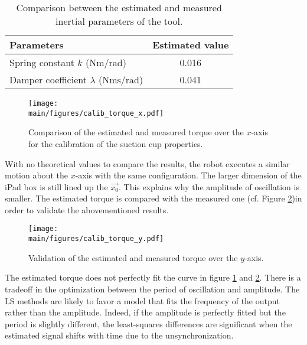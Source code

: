 \documentclass[/home/francois/latex/report/main.tex]{subfiles}
\begin{document}
\begin{table}[h]
  \begin{center}
    \renewcommand{\arraystretch}{1.2} %
    \begin{tabular}{l|c} %
      \textbf{Parameters} & \textbf{Estimated value} \\
      \hline
      Spring constant $k$ ($\si{\newton\meter\per\radian}$) & 0.016\\
      \hline
      Damper coefficient $\lambda$ ($\si{\newton\meter\second\per\radian}$) & 0.041 \\
      \hline
    \end{tabular}
  \end{center}
  \caption{Comparison between the estimated and measured inertial parameters of the tool.\label{tab:results:calibration-cup}}
\end{table}

\begin{figure}
  \centering
    \texttt{[image: \\main/figures/calib\_torque\_x.pdf]}
  \caption{Comparison of the estimated and measured torque over the $x$-axis for the calibration of the suction cup properties.}
  \label{fig:results:calibration:suction-torque-x}
\end{figure}

With no theoretical values to compare the results, the robot executes a similar motion about the $x$-axis with the same configuration. The larger dimension of the iPad box is still lined up the $\overrightarrow{x_0}$. This explains why the amplitude of oscillation is smaller. The estimated torque is compared with the measured one (cf. Figure \ref{fig:results:calibration:suction-torque-y})in order to validate the abovementioned results.

\begin{figure}
  \centering
  \texttt{[image: \\main/figures/calib\_torque\_y.pdf]}
  \caption{Validation of the estimated and measured torque over the $y$-axis.}
  \label{fig:results:calibration:suction-torque-y}
\end{figure}

The estimated torque does not perfectly fit the curve in figure \ref{fig:results:calibration:suction-torque-x} and \ref{fig:results:calibration:suction-torque-y}. There is a tradeoff in the optimization between the period of oscillation and amplitude. The \ac{LS} methods are likely to favor a model that fits the frequency of the output rather than the amplitude. Indeed, if the amplitude is perfectly fitted but the period is slightly different, the least-squares differences are significant when the estimated signal shifts with time due to the unsynchronization.
\end{document}
